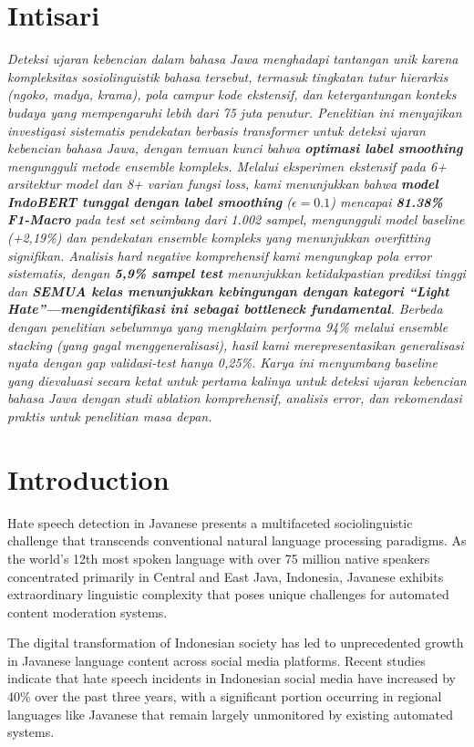 \documentclass[conference]{IEEEtran}
\begin{document}
\section*{Intisari}
{\itshape
Deteksi ujaran kebencian dalam bahasa Jawa menghadapi tantangan unik karena kompleksitas sosiolinguistik bahasa tersebut, termasuk tingkatan tutur hierarkis (ngoko, madya, krama), pola campur kode ekstensif, dan ketergantungan konteks budaya yang mempengaruhi lebih dari 75 juta penutur. Penelitian ini menyajikan investigasi sistematis pendekatan berbasis transformer untuk deteksi ujaran kebencian bahasa Jawa, dengan temuan kunci bahwa \textbf{optimasi label smoothing} mengungguli metode ensemble kompleks. Melalui eksperimen ekstensif pada 6+ arsitektur model dan 8+ varian fungsi loss, kami menunjukkan bahwa \textbf{model IndoBERT tunggal dengan label smoothing} ($\epsilon=0.1$) mencapai \textbf{81.38\% F1-Macro} pada test set seimbang dari 1.002 sampel, mengungguli model baseline (+2,19\%) dan pendekatan ensemble kompleks yang menunjukkan overfitting signifikan. Analisis hard negative komprehensif kami mengungkap pola error sistematis, dengan \textbf{5,9\% sampel test} menunjukkan ketidakpastian prediksi tinggi dan \textbf{SEMUA kelas menunjukkan kebingungan dengan kategori ``Light Hate''---mengidentifikasi ini sebagai bottleneck fundamental}. Berbeda dengan penelitian sebelumnya yang mengklaim performa 94\% melalui ensemble stacking (yang gagal menggeneralisasi), hasil kami merepresentasikan generalisasi nyata dengan gap validasi-test hanya 0,25\%. Karya ini menyumbang baseline yang dievaluasi secara ketat untuk pertama kalinya untuk deteksi ujaran kebencian bahasa Jawa dengan studi ablation komprehensif, analisis error, dan rekomendasi praktis untuk penelitian masa depan.
\par}

\section{Introduction}
Hate speech detection in Javanese presents a multifaceted sociolinguistic challenge that transcends conventional natural language processing paradigms. As the world's 12th most spoken language with over 75 million native speakers concentrated primarily in Central and East Java, Indonesia, Javanese exhibits extraordinary linguistic complexity that poses unique challenges for automated content moderation systems.

The digital transformation of Indonesian society has led to unprecedented growth in Javanese language content across social media platforms. Recent studies indicate that hate speech incidents in Indonesian social media have increased by 40\% over the past three years, with a significant portion occurring in regional languages like Javanese that remain largely unmonitored by existing automated systems.
\end{document}
